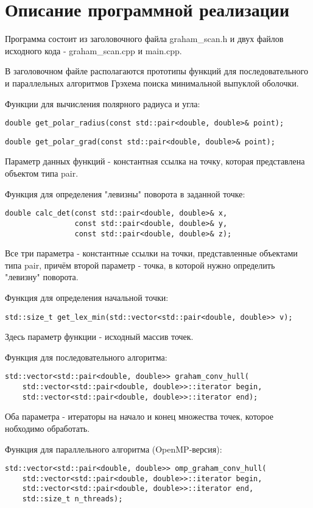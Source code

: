 \documentclass{report}
\begin{document}
\section*{Описание программной реализации}
Программа состоит из заголовочного файла graham\_scan.h и двух файлов исходного кода - graham\_scan.cpp и main.cpp.
\par В заголовочном файле располагаются прототипы функций для последовательного и параллельных алгоритмов Грэхема поиска минимальной выпуклой оболочки.
\par Функции для вычисления полярного радиуса и угла:
\begin{lstlisting}
double get_polar_radius(const std::pair<double, double>& point);
\end{lstlisting}
\begin{lstlisting}
double get_polar_grad(const std::pair<double, double>& point);
\end{lstlisting}
Параметр данных функций - константная ссылка на точку, которая представлена объектом типа pair.
\par Функция для определения "левизны" поворота в заданной точке:
\begin{lstlisting}
double calc_det(const std::pair<double, double>& x,
                const std::pair<double, double>& y,
                const std::pair<double, double>& z);
\end{lstlisting}
Все три параметра - константные ссылки на точки, представленные объектами типа pair, причём второй параметр - точка, в которой нужно определить "левизну" поворота.
\par Функция для определения начальной точки:
\begin{lstlisting}
std::size_t get_lex_min(std::vector<std::pair<double, double>> v);
\end{lstlisting}
Здесь параметр функции - исходный массив точек.
\par Функция для последовательного алгоритма:
\begin{lstlisting}
std::vector<std::pair<double, double>> graham_conv_hull(
    std::vector<std::pair<double, double>>::iterator begin,
    std::vector<std::pair<double, double>>::iterator end);
\end{lstlisting}
Оба параметра - итераторы на начало и конец множества точек, которое нобходимо обработать.
\par Функция для параллельного алгоритма (OpenMP-версия):
\begin{lstlisting}
std::vector<std::pair<double, double>> omp_graham_conv_hull(
    std::vector<std::pair<double, double>>::iterator begin,
    std::vector<std::pair<double, double>>::iterator end,
    std::size_t n_threads);
\end{lstlisting}
\end{document}
